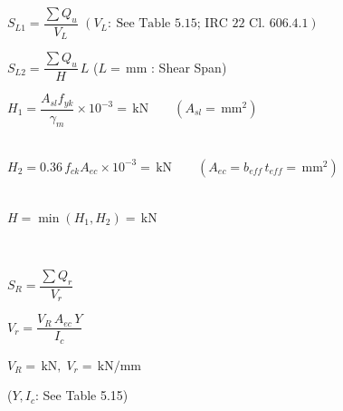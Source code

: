 \documentclass[12pt,a4paper]{report}
\numberwithin{figure}{chapter}
\begin{document}
    \begin{flushleft}

    \noindent\textbullet\hspace{0.5em}
    $S_{L1}=\dfrac{\sum Q_u}{V_L}$
    \hfill
    {\small
    $(V_L:\ \text{See Table 5.15; IRC 22 Cl. 606.4.1})$
    }

    \noindent\textbullet\hspace{0.5em}
    $S_{L2}=\dfrac{\sum Q_u}{H}\,L$
    \hfill
    {\small
    ($L=\,\mathrm{mm}$
    : Shear Span)}

    \hfill


    \hspace*{1.5em}
    $H_1=\dfrac{A_{sl}f_{yk}}{\gamma_m}\times10^{-3}
    =\,\mathrm{kN}
    \qquad
    (A_{sl}=\,\mathrm{mm^2})$

    \\

    \hspace*{1.5em}
    $H_2=0.36\,f_{ck}A_{ec}\times10^{-3}
    =\,\mathrm{kN}
    \qquad
    (A_{ec}=b_{eff}\,t_{eff}
    =\,\mathrm{mm^2})$

    \\

    \hspace*{1.5em}
    $H=\min(H_1,H_2)
    =\,\mathrm{kN}$

    \\

    \vspace{0.4em}

    \noindent\textbullet\hspace{0.5em}$S_R=\dfrac{\sum Q_r}{V_r}$

    \hspace*{1.5em}
    $V_r=\dfrac{V_R\,A_{ec}\,Y}{I_c}$

    \hspace*{1.5em}
    $V_R=\,\mathrm{kN},
    \;
    V_r=\,\mathrm{kN/mm}$

    \hfill
    {\small ($Y,I_c$: See Table 5.15)}
    \vspace{-1.0em}
    \end{flushleft}
    
\smallskip
\noindent\hrulefill
\vspace{1.2em}

\vspace{1em}
\end{document}
